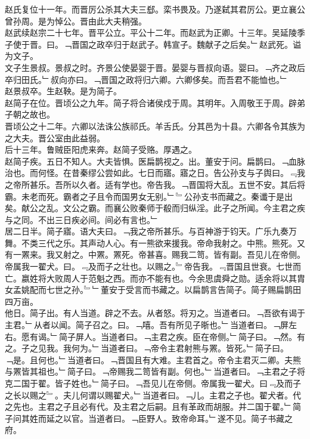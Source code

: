 \documentclass{zhvt-classic}
\begin{document}
\hspace*{2em}赵氏复位十一年。而晋厉公杀其大夫三郄。栾书畏及。乃遂弑其君厉公。更立襄公曾孙周。是为悼公。晋由此大夫稍强。\\
\hspace*{2em}赵武续赵宗二十七年。晋平公立。平公十二年。而赵武为正卿。十三年。吴延陵季子使于晋。曰。﹁晋国之政卒归于赵武子。韩宣子。魏献子之后矣。﹂赵武死。谥为文子。\\
\hspace*{2em}文子生景叔。景叔之时。齐景公使晏婴于晋。晏婴与晋叔向语。婴曰。﹁齐之政后卒归田氏。﹂叔向亦曰。﹁晋国之政将归六卿。六卿侈矣。而吾君不能恤也。﹂\\
\hspace*{2em}赵景叔卒。生赵鞅。是为简子。\\
\hspace*{2em}赵简子在位。晋顷公之九年。简子将合诸侯戍于周。其明年。入周敬王于周。辟弟子朝之故也。\\
\hspace*{2em}晋顷公之十二年。六卿以法诛公族祁氏。羊舌氏。分其邑为十县。六卿各令其族为之大夫。晋公室由此益弱。\\
\hspace*{2em}后十三年。鲁贼臣阳虎来奔。赵简子受赂。厚遇之。\\
\hspace*{2em}赵简子疾。五日不知人。大夫皆惧。医扁鹊视之。出。董安于问。扁鹊曰。﹁血脉治也。而何怪。在昔秦缪公尝如此。七日而寤。寤之日。告公孙支与子舆曰。﹃我之帝所甚乐。吾所以久者。适有学也。帝告我。﹁晋国将大乱。五世不安。其后将霸。未老而死。霸者之子且令而国男女无别。﹂﹄公孙支书而藏之。秦谶于是出矣。献公之乱。文公之霸。而襄公败秦师于殽而归纵淫。此子之所闻。今主君之疾与之同。不出三日疾必间。间必有言也。﹂\\
\hspace*{2em}居二日半。简子寤。语大夫曰。﹁我之帝所甚乐。与百神游于钧天。广乐九奏万舞。不类三代之乐。其声动人心。有一熊欲来援我。帝命我射之。中熊。熊死。又有一罴来。我又射之。中罴。罴死。帝甚喜。赐我二笥。皆有副。吾见儿在帝侧。帝属我一翟犬。曰。﹃及而子之壮也。以赐之。﹄帝告我。﹃晋国且世衰。七世而亡。嬴姓将大败周人于范魁之西。而亦不能有也。今余思虞舜之勋。适余将以其胄女孟姚配而七世之孙。﹄﹂董安于受言而书藏之。以扁鹊言告简子。简子赐扁鹊田四万亩。\\
\hspace*{2em}他日。简子出。有人当道。辟之不去。从者怒。将刃之。当道者曰。﹁吾欲有谒于主君。﹂从者以闻。简子召之。曰。﹁嘻。吾有所见子晣也。﹂当道者曰。﹁屏左右。愿有谒。﹂简子屏人。当道者曰。﹁主君之疾。臣在帝侧。﹂简子曰。﹁然。有之。子之见我。我何为。﹂当道者曰。﹁帝令主君射熊与罴。皆死。﹂简子曰。﹁是。且何也。﹂当道者曰。﹁晋国且有大难。主君首之。帝令主君灭二卿。夫熊与罴皆其祖也。﹂简子曰。﹁帝赐我二笥皆有副。何也。﹂当道者曰。﹁主君之子将克二国于翟。皆子姓也。﹂简子曰。﹁吾见儿在帝侧。帝属我一翟犬。曰﹃及而子之长以赐之﹄。夫儿何谓以赐翟犬。﹂当道者曰。﹁儿。主君之子也。翟犬者。代之先也。主君之子且必有代。及主君之后嗣。且有革政而胡服。并二国于翟。﹂简子问其姓而延之以官。当道者曰。﹁臣野人。致帝命耳。﹂遂不见。简子书藏之府。\\
\end{document}
